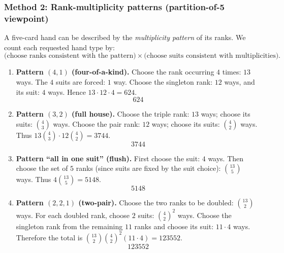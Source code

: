 \documentclass[12pt]{article}
\begin{document}
\subsubsection{Method 2: Rank-multiplicity patterns (partition-of-5 viewpoint)}
A five-card hand can be described by the \emph{multiplicity pattern} of its ranks. We count each requested hand type by:
\[
\text{(choose ranks consistent with the pattern)}\times \text{(choose suits consistent with multiplicities)}.
\]

\begin{enumerate}[label=(\alph*)]
\item \textbf{Pattern $(4,1)$ (four-of-a-kind).}
Choose the rank occurring $4$ times: $13$ ways. The $4$ suits are forced: $1$ way.
Choose the singleton rank: $12$ ways, and its suit: $4$ ways. Hence $13\cdot 12\cdot 4=624$.
\[
\boxed{624}
\]

\item \textbf{Pattern $(3,2)$ (full house).}
Choose the triple rank: $13$ ways; choose its suits: $\binom{4}{3}$ ways.
Choose the pair rank: $12$ ways; choose its suits: $\binom{4}{2}$ ways.
Thus $13\binom{4}{3}\cdot 12\binom{4}{2}=3744$.
\[
\boxed{3744}
\]

\item \textbf{Pattern ``all in one suit'' (flush).}
First choose the suit: $4$ ways. Then choose the set of $5$ ranks (since suits are fixed by the suit choice): $\binom{13}{5}$ ways.
Thus $4\binom{13}{5}=5148$.
\[
\boxed{5148}
\]

\item \textbf{Pattern $(2,2,1)$ (two-pair).}
Choose the two ranks to be doubled: $\binom{13}{2}$ ways. For each doubled rank, choose $2$ suits: $\binom{4}{2}^2$ ways.
Choose the singleton rank from the remaining $11$ ranks and choose its suit: $11\cdot 4$ ways.
Therefore the total is $\binom{13}{2}\binom{4}{2}^2(11\cdot 4)=123552$.
\[
\boxed{123552}
\]
\end{enumerate}
\end{document}

